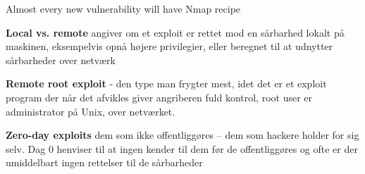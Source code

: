 \documentclass[Screen16to9,17pt]{foils}
\begin{document}
\centerline{Almost every new vulnerability will have Nmap recipe}












\begin{list1}
\item {\bfseries Local vs. remote}
angiver om et exploit er rettet mod
en sårbarhed lokalt på maskinen, eksempelvis
opnå højere privilegier, eller beregnet
til at udnytter sårbarheder over netværk
\item {\bfseries Remote root exploit}
- den type man frygter mest, idet
det er et exploit program der når det afvikles giver
angriberen fuld kontrol, root user er administrator
på Unix, over netværket.
\item {\bfseries Zero-day exploits} dem som ikke offentliggøres -- dem
  som hackere holder for sig selv. Dag 0 henviser til at ingen kender
  til dem før de offentliggøres og ofte er der umiddelbart ingen
  rettelser til de sårbarheder
\end{list1}





\slidenext
\end{document}
